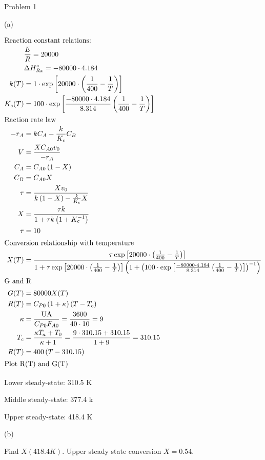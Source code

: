 \item Problem 1

(a)

\begin{align*}
    \intertext{Reaction constant relations:}
    & \frac{E}{R} = 20000 \\
    & \Delta H_{Rx}^\circ = -80000 \cdot 4.184 \\
    k(T) &= 1 \cdot \exp\left[20000 \cdot \left(\frac{1}{400} - \frac{1}{T}\right)\right] \\
    K_c(T) &= 100 \cdot \exp\left[\frac{-80000 \cdot 4.184}{8.314} \left(\frac{1}{400} - \frac{1}{T}\right)\right] \\
    \intertext{Raction rate law}
    -r_A &= k C_A - \frac{k}{K_c} C_B \\
    V &= \frac{X C_{A0} v_0}{-r_A} \\
    C_A &= C_{A0} \left(1 - X\right) \\
    C_B &= C_{A0} X \\
    \tau &= \frac{X v_0}{k \left(1 - X\right) - \frac{k}{K_c} X} \\
    X &= \frac{\tau k}{1 + \tau k \left(1 + K_c^{-1}\right)} \\
    \tau &= 10 \\
    \intertext{Conversion relationship with temperature}
    X(T) &= \frac{\tau \exp\left[20000 \cdot \left(\frac{1}{400} - \frac{1}{T}\right)\right]}{1 + \tau \exp\left[20000 \cdot \left(\frac{1}{400} - \frac{1}{T}\right)\right] \left(1 + \left(100 \cdot \exp\left[\frac{-80000 \cdot 4.184}{8.314} \left(\frac{1}{400} - \frac{1}{T}\right)\right]\right)^{-1}\right)} \\
    \intertext{G and R}
    G(T) &= 80000 X(T) \\
    R(T) &= C_{P0} \left(1 + \kappa\right) \left(T - T_c\right) \\
    \kappa &= \frac{\text{UA}}{C_{P0} F_{A0}} = \frac{3600}{40 \cdot 10} = 9 \\
    T_c &= \frac{\kappa T_a + T_0}{\kappa + 1} = \frac{9 \cdot 310.15 + 310.15}{1 + 9} = 310.15 \\
    R(T) &= 400 \left(T - 310.15\right) \\
    \intertext{Plot R(T) and G(T)}
\end{align*}

Lower steady-state: 310.5 K

Middle steady-state: 377.4 k

Upper steady-state: 418.4 K

\begin{center}
    
\end{center}

(b)

Find $X(418.4 K)$. Upper steady state conversion $\boxed{X=0.54}$.